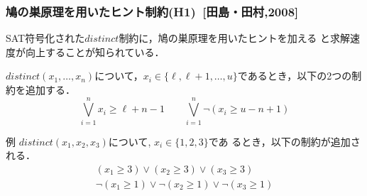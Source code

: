 \documentclass [dvipdfmx,11pt]{beamer}
\newcommand{\distinct}{$distinct$}
\begin{document}
\begin{frame}
  \frametitle{鳩の巣原理を用いたヒント制約(H1)~[田島・田村,2008]}
  SAT符号化された{\distinct}制約に，鳩の巣原理を用いたヒントを加える
  と求解速度が向上することが知られている．
  \begin{block}{}
    $distinct(x_{1},\ldots,x_{n})$について，$x_i \in
    \{\ell,\ell+1,\ldots,u\}$であるとき，以下の2つの制約を追加する．
    \[
      \bigvee_{i=1}^{n}x_{i}\geq \ell+n-1 \qquad
      \bigvee_{i=1}^{n}\lnot (x_{i}\geq u-n+1)
    \]
  \end{block}
  \begin{exampleblock}{例}
    $distinct(x_1, x_2, x_3)$について, $x_i \in \{1,2,3\}$であ
    るとき，以下の制約が追加される．
    \vspace{-3mm}
    \begin{eqnarray*}
      (x_1 \geq 3) \lor (x_2 \geq 3) \lor (x_3 \geq 3)\\
      \lnot (x_1\geq 1) \lor \lnot (x_2 \geq 1) \lor \lnot (x_3 \geq 1)
    \end{eqnarray*}
  \end{exampleblock}
\end{frame}
\end{document}
